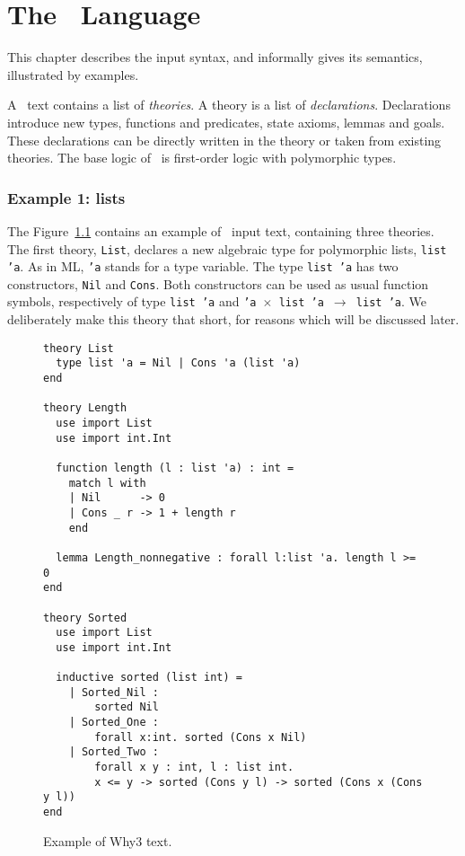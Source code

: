 \chapter{The \why\ Language}
\label{chap:syntax}

This chapter describes the input syntax, and informally gives its semantics,
illustrated by examples.

A \why\ text contains a list of \emph{theories}.
A theory is a list of \emph{declarations}. Declarations introduce new
types, functions and predicates, state axioms, lemmas and goals.
These declarations can be directly written in the theory or taken from
existing theories. The base logic of \why\ is first-order
logic with polymorphic types.

\subsection{Example 1: lists}

The Figure~\ref{fig:tutorial1} contains an example of \why\ input
text, containing three theories. The first theory, \texttt{List},
declares a new algebraic type for polymorphic lists, \texttt{list 'a}.
As in ML, \texttt{'a} stands for a type variable.
The type \texttt{list 'a} has two constructors, \texttt{Nil} and
\texttt{Cons}. Both constructors can be used as usual function
symbols, respectively of type \texttt{list 'a} and \texttt{'a
  $\times$ list 'a $\rightarrow$ list 'a}.
We deliberately make this theory that short, for reasons which will be
discussed later.

\begin{figure}
\centering
\begin{verbatim}
theory List
  type list 'a = Nil | Cons 'a (list 'a)
end

theory Length
  use import List
  use import int.Int

  function length (l : list 'a) : int =
    match l with
    | Nil      -> 0
    | Cons _ r -> 1 + length r
    end

  lemma Length_nonnegative : forall l:list 'a. length l >= 0
end

theory Sorted
  use import List
  use import int.Int

  inductive sorted (list int) =
    | Sorted_Nil :
        sorted Nil
    | Sorted_One :
        forall x:int. sorted (Cons x Nil)
    | Sorted_Two :
        forall x y : int, l : list int.
        x <= y -> sorted (Cons y l) -> sorted (Cons x (Cons y l))
end
\end{verbatim}
\caption{Example of Why3 text.}
\label{fig:tutorial1}
\end{figure}

